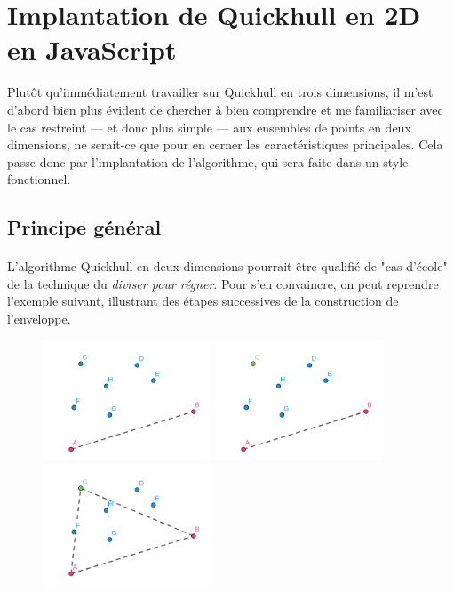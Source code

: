 \documentclass[]{article}
\begin{document}
\pagebreak
\section{Implantation de Quickhull en 2D en JavaScript}
Plutôt qu'immédiatement travailler sur Quickhull en trois dimensions, il m'est d'abord bien plus évident de chercher à bien comprendre et me familiariser avec le cas restreint — et donc plus simple — aux ensembles de points en deux dimensions, ne serait-ce que pour en cerner les caractéristiques principales. Cela passe donc par l'implantation de l'algorithme, qui sera faite dans un style fonctionnel.

\subsection{Principe général}
\paragraph{}
L'algorithme Quickhull en deux dimensions pourrait être qualifié de "cas d'école" de la technique du \emph{diviser pour régner}. Pour s'en convaincre, on peut reprendre l'exemple suivant, illustrant des étapes successives de la construction de l'enveloppe.

\begin{figure}[H]
	\begin{center}
		\includegraphics[width=5cm]{qh2d/geogebra-export.png}
		\includegraphics[width=5cm]{qh2d/geogebra-export2.png}
		\includegraphics[width=5cm]{qh2d/geogebra-export3.png}
	\end{center}
\end{figure}
\end{document}
